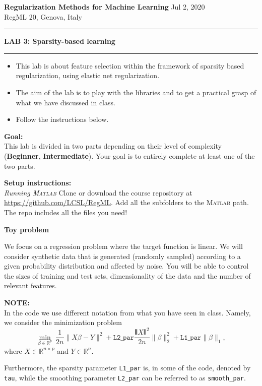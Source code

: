 \documentclass[DIN, pagenumber=false, fontsize=11pt, parskip=half]{scrartcl}
\newcommand{\MATLAB}{\textsc{Matlab}\xspace}
\newcommand{\mytitle}[1]{{\noindent\LARGE\textbf{#1}}}
\newcommand{\mysection}[1]{\noindent\large\textbf{#1}}
\begin{document}
\noindent\textbf{Regularization Methods for Machine Learning} \hfill Jul 2, 2020\\
RegML 20, Genova, Italy \\ \rule{\textwidth}{1pt}

\mytitle{LAB 3: Sparsity-based learning}\\
\rule{\textwidth}{1pt}
\begin{itemize}\itemsep1pt \parskip0pt 
  \item This lab is about feature selection within the framework of sparsity based regularization, using elastic net regularization.
  \item The aim of the lab is to play with the libraries and to get a practical grasp of what we have discussed in class.
  \item Follow the instructions below.
\end{itemize}

\begin{framed}
\textbf{\textbf{Goal}:} \\
This lab is divided in two parts depending on their level of complexity (\textbf{Beginner}, \textbf{Intermediate}).
Your goal is to entirely complete at least one of the two parts.
\end{framed}

\begin{framed}
\textbf{\textbf{Setup instructions}:} \\
\textit{Running \MATLAB}
Clone or download the course repository at \url{https://github.com/LCSL/RegML}. Add all the subfolders to the \MATLAB path. The repo includes all the files you need!
\end{framed}

\mysection{Toy problem}

We focus on a regression problem where the target function is linear.
We will consider synthetic data that is generated (randomly sampled) according to a given probability distribution and affected by noise.
You will be able to control the sizes of training and test sets, dimensionality of the data and the number of relevant features.

\begin{framed}
\textbf{NOTE:} \\
In the code we use different notation from what you have seen in class. Namely, we consider the minimization problem
\begin{equation*}
\min_{\beta\in \mathbb{R}^p} \  \frac{1}{2n} \|X\beta-Y\|^2 +
\texttt{L2\_par} \frac{\VERT X \VERT^2}{2n}\|\beta\|^2_2 +
\texttt{L1\_par}\|\beta\|_1 ,
\end{equation*}
where $X \in \mathbb{R}^{n \times p}$ and $Y \in \mathbb{R}^n$.

Furthermore, the sparsity parameter \texttt{L1\_par} is, in some of the code, denoted by \texttt{tau}, while the smoothing parameter \texttt{L2\_par} can be referred to as \texttt{smooth\_par}.
\end{framed}
\end{document}
